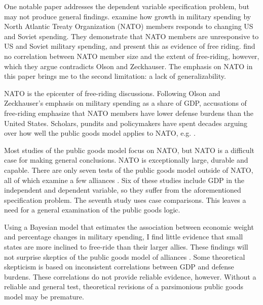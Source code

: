 \documentclass[12pt]{article}
\begin{document}
One notable paper addresses the dependent variable specification problem, but may not produce general findings. 
\citet{PluemperNeumayer2015} examine how growth in military spending by North Atlantic Treaty Organization (NATO) members responds to changing US and Soviet spending.
They demonstrate that NATO members are unresponsive to US and Soviet military spending, and present this as evidence of free riding.
\citet{PluemperNeumayer2015} find no correlation between NATO member size and the extent of free-riding, however, which they argue contradicts Olson and Zeckhauser.
The emphasis on NATO in this paper brings me to the second limitation: a lack of generalizability. 


NATO is the epicenter of free-riding discussions. 
Following Olson and Zeckhauser's emphasis on military spending as a share of GDP, accusations of free-riding emphasize that NATO members have lower defense burdens than the United States. 
Scholars, pundits and policymakers have spent decades arguing over how well the public goods model applies to NATO, e.g. \citep{Pryor1968, SandlerForbes1980, Palmer1990, HiltonVhu1991, Boyer1993, GatesTerasawa1992, SandlerHartley2001, Lanoszka2015, PluemperNeumayer2015, KimSandler2019}.


Most studies of the public goods model focus on NATO, but NATO is a difficult case for making general conclusions. 
NATO is exceptionally large, durable and capable. 
There are only seven tests of the public goods model outside of NATO, all of which examine a few alliances \citep{Russett1970, Starr1974, Reisinger1983, Thies1987, ConybeareSandler1990, OnealWhatley1996, Siroky2012}. 
Six of these studies include GDP in the independent and dependent variable, so they suffer from the aforementioned specification problem.
The seventh study uses case comparisons.
This leaves a need for a general examination of the public goods logic. 



Using a Bayesian model that estimates the association between economic weight and percentage changes in military spending, I find little evidence that small states are more inclined to free-ride than their larger allies.
These findings will not surprise skeptics of the public goods model of alliances \citep{Palmer1990, GatesTerasawa1992, SandlerHartley2001, Norrlof2010, NiouZeigler2019}.
Some theoretical skepticism is based on inconsistent correlations between GDP and defense burdens. 
These correlations do not provide reliable evidence, however. 
Without a reliable and general test, theoretical revisions of a parsimonious public goods model may be premature.
\end{document}
